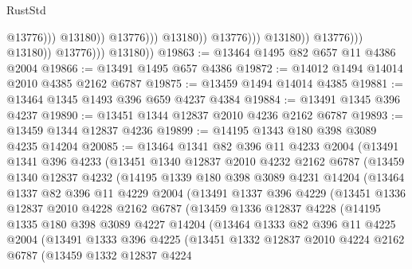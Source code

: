 \begin{lexlean}{RustStd}
\begin{coremodule}
                                                      @13776)))
                                                @13180))
                                            @13776)))
                                      @13180))
                                  @13776)))
                            @13180))
                        @13776)))
                  @13180))
              @13776)))
        @13180))
@19863 := @13464 @1495 @82 @657 @11 @4386 @2004
@19866 := @13491 @1495 @657 @4386
@19872 := @14012 @1494 @14014 @2010 @4385 @2162 @6787
@19875 := @13459 @1494 @14014 @4385
@19881 := @13464 @1345 @1493 @396 @659 @4237 @4384
@19884 := @13491 @1345 @396 @4237
@19890 := @13451 @1344 @12837 @2010 @4236 @2162 @6787
@19893 := @13459 @1344 @12837 @4236
@19899 := @14195 @1343 @180 @398 @3089 @4235 @14204
@20085 := @13464
    @1341
    @82
    @396
    @11
    @4233
    @2004
    (@13491
      @1341
      @396
      @4233
      (@13451
        @1340
        @12837
        @2010
        @4232
        @2162
        @6787
        (@13459
          @1340
          @12837
          @4232
          (@14195
            @1339
            @180
            @398
            @3089
            @4231
            @14204
            (@13464
              @1337
              @82
              @396
              @11
              @4229
              @2004
              (@13491
                @1337
                @396
                @4229
                (@13451
                  @1336
                  @12837
                  @2010
                  @4228
                  @2162
                  @6787
                  (@13459
                    @1336
                    @12837
                    @4228
                    (@14195
                      @1335
                      @180
                      @398
                      @3089
                      @4227
                      @14204
                      (@13464
                        @1333
                        @82
                        @396
                        @11
                        @4225
                        @2004
                        (@13491
                          @1333
                          @396
                          @4225
                          (@13451
                            @1332
                            @12837
                            @2010
                            @4224
                            @2162
                            @6787
                            (@13459
                              @1332
                              @12837
                              @4224

\end{coremodule}
\end{lexlean}
